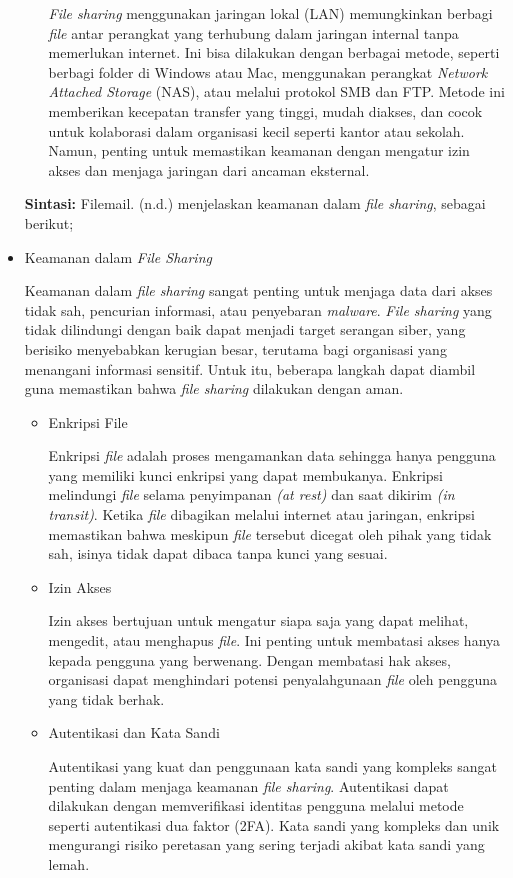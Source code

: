 \documentclass[12pt]{article}
\begin{document}
\begin{itemize}
\begin{itemize}
        \textit{File sharing} menggunakan jaringan lokal (LAN) memungkinkan berbagi \textit{file} antar perangkat yang terhubung dalam jaringan internal tanpa memerlukan internet. Ini bisa dilakukan dengan berbagai metode, seperti berbagi folder di Windows atau Mac, menggunakan perangkat \textit{Network Attached Storage} (NAS), atau melalui protokol SMB dan FTP. Metode ini memberikan kecepatan transfer yang tinggi, mudah diakses, dan cocok untuk kolaborasi dalam organisasi kecil seperti kantor atau sekolah. Namun, penting untuk memastikan keamanan dengan mengatur izin akses dan menjaga jaringan dari ancaman eksternal.
    \end{itemize}
      \textbf{  Sintasi:} Filemail. (n.d.) menjelaskan keamanan dalam \textit{file sharing}, sebagai berikut;
    \item Keamanan dalam \textit{File Sharing}
    
    Keamanan dalam \textit{file sharing} sangat penting untuk menjaga data dari akses tidak sah, pencurian informasi, atau penyebaran \textit{malware}. \textit{File sharing} yang tidak dilindungi dengan baik dapat menjadi target serangan siber, yang berisiko menyebabkan kerugian besar, terutama bagi organisasi yang menangani informasi sensitif. Untuk itu, beberapa langkah dapat diambil guna memastikan bahwa \textit{file sharing} dilakukan dengan aman.
    \begin{itemize}
        \item Enkripsi File

        Enkripsi \textit{file} adalah proses mengamankan data sehingga hanya pengguna yang memiliki kunci enkripsi yang dapat membukanya. Enkripsi melindungi\textit{ file }selama penyimpanan \textit{(at rest)} dan saat dikirim \textit{(in transit)}. Ketika \textit{file} dibagikan melalui internet atau jaringan, enkripsi memastikan bahwa meskipun \textit{file} tersebut dicegat oleh pihak yang tidak sah, isinya tidak dapat dibaca tanpa kunci yang sesuai.
        \item Izin Akses

        Izin akses bertujuan untuk mengatur siapa saja yang dapat melihat, mengedit, atau menghapus \textit{file}. Ini penting untuk membatasi akses hanya kepada pengguna yang berwenang. Dengan membatasi hak akses, organisasi dapat menghindari potensi penyalahgunaan \textit{file} oleh pengguna yang tidak berhak.

        \item Autentikasi dan Kata Sandi

        Autentikasi yang kuat dan penggunaan kata sandi yang kompleks sangat penting dalam menjaga keamanan \textit{file sharing}. Autentikasi dapat dilakukan dengan memverifikasi identitas pengguna melalui metode seperti autentikasi dua faktor (2FA). Kata sandi yang kompleks dan unik mengurangi risiko peretasan yang sering terjadi akibat kata sandi yang lemah.


\end{itemize}
\end{itemize}
\end{document}
